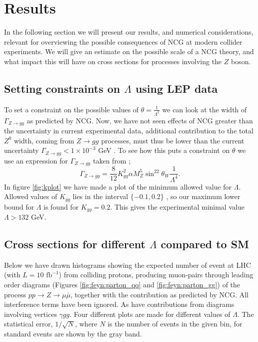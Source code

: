 \section{Results}
In the following section we will present our results, and numerical considerations, relevant for overviewing the possible consequences of NCG at modern collider experiments. We will give an estimate on the possible scale of a NCG theory, and what impact this will have on cross sections for processes involving the $Z$ boson.

\subsection{Setting constraints on $\Lambda$ using LEP data}
To set a constraint on the possible values of $\theta = \frac{1}{\Lambda^2}$ we can look at the width of $\Gamma_{Z \rightarrow gg}$ as predicted by NCG. Now, we have not seen effects of NCG greater than the uncertainty in current experimental data, additional contribution to the total $Z^0$ width, coming from $Z \rightarrow gg$ processes, must thus be lower than the current uncertainty $\Gamma_{Z \rightarrow gg} < 1 \times 10^{-3}$ GeV \cite{behr2003dnc}. To see how this puts a constraint on $\theta$ we use an expression for $\Gamma_{Z \rightarrow gg}$ taken from \cite{behr2003dnc};
\begin{equation} \label{eq:zggwidth}
	\Gamma_{Z \rightarrow gg} = \frac{8}{12} K_{gg}^2 \alpha M_Z^5 \sin^22\theta_W \frac{1}{\Lambda^4}.
\end{equation}
In figure \ref{fig:kplot} we have made a plot of the minimum allowed value for $\Lambda$. Allowed values of $K_{gg}$ lies in the interval $\{-0.1,0.2\}$ \cite{behr2003dnc}, so our maximum lower bound for $\Lambda$ is found for $K_{gg}=0.2$. This gives the experimental minimal value $\Lambda >132$ GeV.

\subsection{Cross sections for different $\Lambda$ compared to SM}
Below we have drawn histograms showing the expected number of event at LHC (with $L=10 \textrm{ fb}^{-1}$) from colliding protons, producing muon-pairs through leading order diagrams (Figures \ref{fig:feyn:parton_qq} and \ref{fig:feyn:parton_gg}) of the process $pp \rightarrow Z \rightarrow \mu \bar \mu$, together with the contribution as predicted by NCG. All interference terms have been ignored. As have contributions from diagrams involving vertices $\gamma gg$. Four different plots are made for different values of $\Lambda$. The statistical error, $1/\sqrt{N}$, where $N$ is the number of events in the given bin, for standard events are shown by the gray band.

